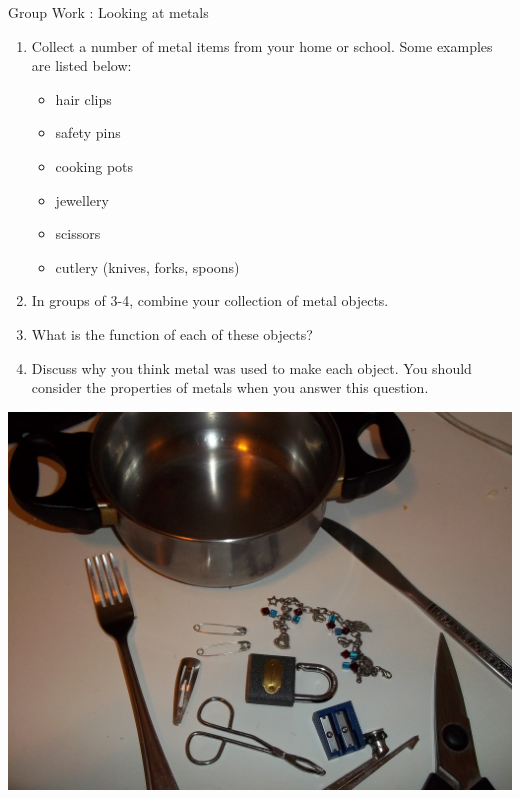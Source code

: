             \begin{activity}{Group Work : Looking at metals}{
            \nopagebreak
\begin{minipage}{0.5\textwidth}
        \label{m38708*id65869}\begin{enumerate}[noitemsep, label=\textbf{\arabic*}. ] 
            \label{m38708*uid83}\item Collect a number of metal items from your home or school. Some examples are listed below:
\label{m38708*id65885}\begin{itemize}[noitemsep]
            \label{m38708*uid84}\item hair clips
\label{m38708*uid85}\item safety pins
\label{m38708*uid86}\item cooking pots
\label{m38708*uid87}\item jewellery
\label{m38708*uid88}\item scissors
\label{m38708*uid89}\item cutlery (knives, forks, spoons)
\end{itemize}
        \label{m38708*uid90}\item In groups of 3-4, combine your collection of metal objects.
\label{m38708*uid91}\item What is the function of each of these objects?
\label{m38708*uid92}\item Discuss why you think metal was used to make each object. You should consider the properties of metals when you answer this question.
\end{enumerate}
\end{minipage}
\begin{minipage}{.5\textwidth}
\begin{center}
 \includegraphics[width=.8\textwidth]{photos/metal_objects.jpg}\par
\end{center}
\end{minipage}
}
\end{activity}
      \label{m38708*uid93}
